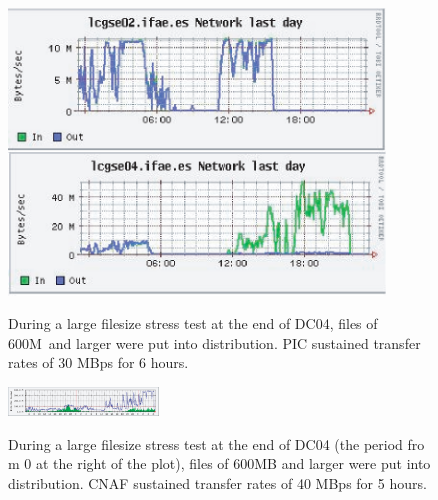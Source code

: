 \documentclass{cmspaper}
\begin{document}
\clearpage
\begin{figure}[tbp]
\centering
\includegraphics[angle=90,width=10cm]{PIC-stress.eps}
\label{fig:PIC-stress}
\caption{During a large filesize stress test at the end of DC04, files of 600M\ and larger were put into distribution. PIC sustained transfer rates of 30 MBps for 6 hours.}
\end{figure}
\clearpage
\begin{figure}[tbp]
\centering
\includegraphics[angle=90,width=4cm]{CNAF-stress.eps}
\label{fig:CNAF-stress}
\caption{During a large filesize stress test at the end of DC04 (the period fro m 0 at the right of the plot), files of 600MB and larger were put into distribution. CNAF sustained transfer rates of 40 MBps for 5 hours.}
\end{figure}
\end{document}
